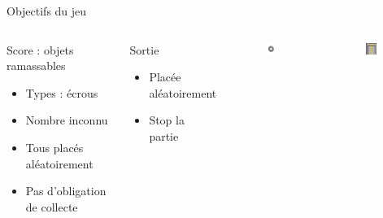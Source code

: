 \documentclass{beamer}
\begin{document}
{\begin{frame}{Objectifs du jeu}
    \begin{columns}
        \begin{block}{Score : objets ramassables}
            \begin{itemize}
                \item[\bullet] Types : écrous
                \item[\bullet] Nombre inconnu
                \item[\bullet] Tous placés aléatoirement
                \item[\bullet] Pas d'obligation de collecte
            \end{itemize}
        \end{block}
        \begin{block}{Sortie}
            \begin{itemize}
                \item[\bullet] Placée aléatoirement
                \item[\bullet] Stop la partie
            \end{itemize}
        \end{block}
        \begin{figure}
            \centering
            \includegraphics[width=0.6\textwidth]{nut}
        \end{figure}
        \begin{figure}
            \centering
            \includegraphics[width=0.6\textwidth]{exit}
        \end{figure}


\end{columns}
\end{frame}}
\end{document}
